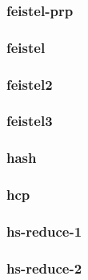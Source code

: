 \begin{frame}\frametitle{feistel-prp}
\begin{figure}
\begin{center}

\end{center}
\end{figure}
\end{frame}
\begin{frame}\frametitle{feistel}
\begin{figure}
\begin{center}

\end{center}
\end{figure}
\end{frame}
\begin{frame}\frametitle{feistel2}
\begin{figure}
\begin{center}

\end{center}
\end{figure}
\end{frame}
\begin{frame}\frametitle{feistel3}
\begin{figure}
\begin{center}

\end{center}
\end{figure}
\end{frame}
\begin{frame}\frametitle{hash}
\begin{figure}
\begin{center}

\end{center}
\end{figure}
\end{frame}
\begin{frame}\frametitle{hcp}
\begin{figure}
\begin{center}

\end{center}
\end{figure}
\end{frame}
\begin{frame}\frametitle{hs-reduce-1}
\begin{figure}
\begin{center}

\end{center}
\end{figure}
\end{frame}
\begin{frame}\frametitle{hs-reduce-2}
\begin{figure}
\begin{center}

\end{center}
\end{figure}
\end{frame}
